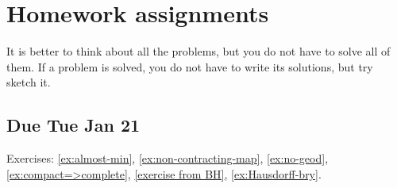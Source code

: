 \addtocounter{chapter}{-1}
\chapter{Homework assignments}

It is better to think about all the problems, but you do not have to solve all of them.
If a problem is solved, you do not have to write its solutions, but try sketch it.

\section{Due Tue Jan 21}

Exercises: \ref{ex:almost-min}, \ref{ex:non-contracting-map}, \ref{ex:no-geod}, \ref{ex:compact=>complete}, \ref{exercise from BH}, \ref{ex:Hausdorff-bry}.
